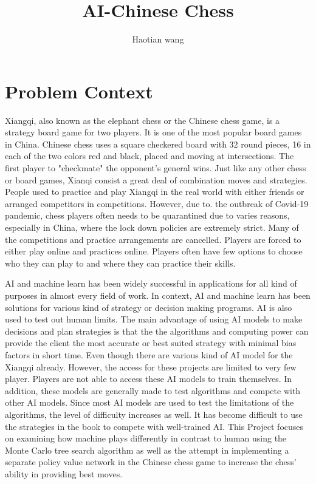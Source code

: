 \documentclass[10pt,twocolumn]{article}
\title{AI-Chinese Chess}
\author{Haotian wang}
\affiliation{Occidental College}
\begin{document}
\maketitle

\section{Problem Context}
    Xiangqi, also known as the elephant chess or the Chinese chess game, is a strategy board game for two players. It is one of the most popular board games in China. Chinese chess uses a square checkered board with 32 round pieces, 16 in each of the two colors red and black, placed and moving at intersections. The first player to "checkmate" the opponent's general wins. Just like any other chess or board games, Xianqi consist a great deal of combination moves and strategies\cite{XiangQi}.
    People used to practice and play Xiangqi in the real world with either friends or arranged competitors in competitions. However, due to. the outbreak of Covid-19 pandemic, chess players often needs to be quarantined due to varies reasons, especially in China, where the lock down policies are extremely strict. Many of the competitions and practice arrangements are cancelled. Players are forced to either play online and practices online.  Players often have few options to choose who they can play to and where they can practice their skills. 
    
    AI and machine learn has been widely successful in applications for all kind of purposes in almost every field of work. In context, AI and machine learn has been solutions for various kind of strategy or decision making programs. AI is also used to test out human limits. The main advantage of using AI models to make decisions and plan strategies is that the the algorithms and computing power can provide the client the most accurate or best suited strategy with minimal bias factors in short time. Even though there are various kind of AI model for the Xiangqi already. However, the access for these projects are limited to very few player. Players are not able to access these AI models to train themselves. In addition, these models are generally made to test algorithms and compete with other AI models\cite{4M}. Since most AI models are used to test the limitations of the algorithms, the level of difficulty increases as well. It has become difficult to use the strategies in the book to compete with well-trained AI. This Project focuses on examining how machine plays differently in contrast to human using the Monte Carlo tree search algorithm as well as the attempt in implementing a separate policy value network in the Chinese chess game to increase the chess' ability in providing best moves. 
    
\end{document}
